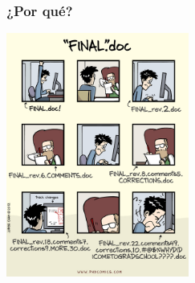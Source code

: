 \documentclass{beamer}
\title{\titulo}
\author{\autor}
\institute[IDR/UPM]{IDR/UPM}
\date{\fecha}
\begin{document}
	
\maketitle


\begin{frame}\frametitle{¿Por qué?}
	\centering
	\includegraphics[height=8cm]{fig/phd.jpeg}
\end{frame}
\end{document}
